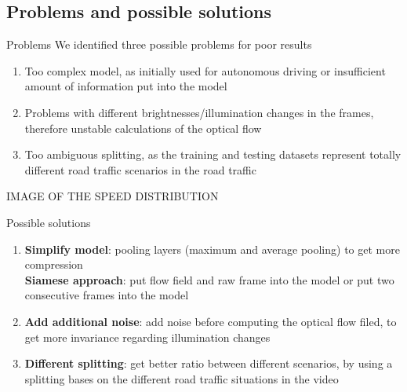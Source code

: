 \subsection{Problems and possible solutions}
\begin{frame}{Problems}
We identified three possible problems for poor results
\begin{enumerate}
\item Too complex model, as initially used for autonomous driving or insufficient amount of information put into the model
\item Problems with different brightnesses/illumination changes in the frames, therefore unstable calculations of the optical flow
\item Too ambiguous splitting, as the training and testing datasets represent totally different road traffic scenarios in the road 
traffic
\end{enumerate}
IMAGE OF THE SPEED DISTRIBUTION
\end{frame}
\begin{frame}{Possible solutions}

\begin{enumerate}
\item \textbf{Simplify model}: pooling layers (maximum and average pooling) to get more compression\\
\textbf{Siamese approach}: put flow field and raw frame into the model or put two consecutive frames into the model
\item \textbf{Add additional noise}: add noise before computing the optical flow filed, to get more invariance regarding illumination changes
\item \textbf{Different splitting}: get better ratio between different scenarios, by using a splitting bases on the different road traffic situations in
the video
\end{enumerate}
\end{frame}
